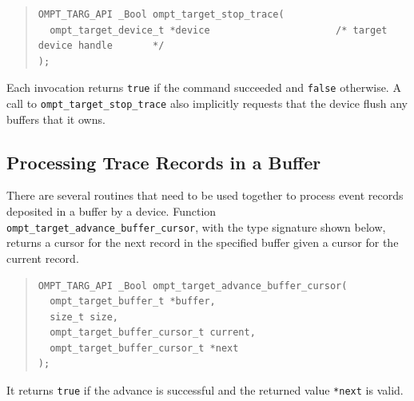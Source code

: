 \documentclass{article}
\begin{document}
\begin{quote}
\begin{verbatim}
OMPT_TARG_API _Bool ompt_target_stop_trace(
  ompt_target_device_t *device                      /* target device handle       */
);
\end{verbatim}
\end{quote}
\noindent
Each invocation returns \verb|true| if the command succeeded and \verb|false| otherwise.
A call to \verb|ompt_target_stop_trace| also implicitly requests that the device flush any buffers that it owns.


\subsection{Processing Trace Records in a Buffer}
\label{sec:record-data}

There are several routines that need to be used together to process %
event records deposited in a buffer by a device. Function \verb|ompt_target_advance_buffer_cursor|, with the type signature shown below, returns a cursor for the next record in the specified buffer given a cursor for the current record.

\begin{quote}
\begin{verbatim}
OMPT_TARG_API _Bool ompt_target_advance_buffer_cursor(
  ompt_target_buffer_t *buffer,
  size_t size, 
  ompt_target_buffer_cursor_t current, 
  ompt_target_buffer_cursor_t *next
); 
\end{verbatim}
\end{quote}
It returns \verb|true| if the advance is successful and the returned value \verb|*next| is valid.
\end{document}
